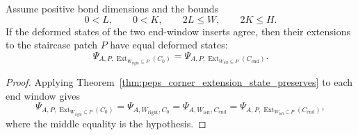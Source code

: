 \begin{theorem}
    \label{thm:peps_horizontal_staircase_patch_extend_eq}
    \leanok
    Assume positive bond dimensions and the bounds
    \[
        0<L,\qquad 0<K,\qquad 2L\le W,\qquad 2K\le H.
    \]
    If the deformed states of the two end-window inserts agree, then their
    extensions to the staircase patch $P$ have equal deformed states:
    \[
        \Psi_{A,P,\operatorname{Ext}_{W_{\mathrm{right}}\subseteq P}(C_0)}
        =
        \Psi_{A,P,\operatorname{Ext}_{W_{\mathrm{left}}\subseteq P}(C_{\mathrm{end}})}.
    \]
\end{theorem}
\begin{proof}
    \leanok
    Applying Theorem~\ref{thm:peps_corner_extension_state_preserves} to each
    end window gives
    \[
        \Psi_{A,P,\operatorname{Ext}_{W_{\mathrm{right}}\subseteq P}(C_0)}
        =
        \Psi_{A,W_{\mathrm{right}},C_0}
        =
        \Psi_{A,W_{\mathrm{left}},C_{\mathrm{end}}}
        =
        \Psi_{A,P,\operatorname{Ext}_{W_{\mathrm{left}}\subseteq P}(C_{\mathrm{end}})},
    \]
    where the middle equality is the hypothesis.
\end{proof}

